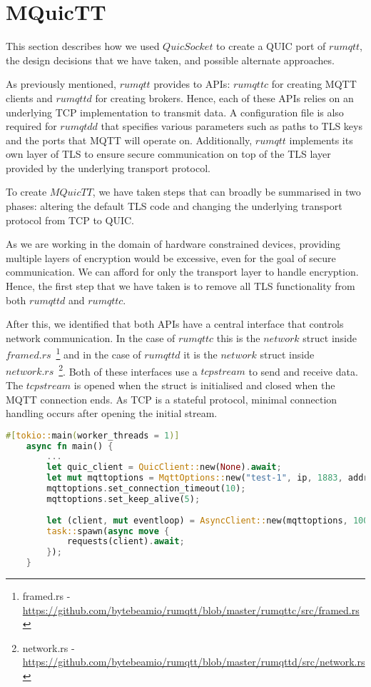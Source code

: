 \chapter{MQuicTT} \label{chap:port}

This section describes how we used $QuicSocket$ to create a QUIC port of $rumqtt$, the design decisions that we have taken, and possible alternate approaches.

As previously mentioned, $rumqtt$ provides to APIs: $rumqttc$ for creating MQTT clients and $rumqttd$ for creating brokers.
Hence, each of these APIs relies on an underlying TCP implementation to transmit data.
A configuration file is also required for $rumqtdd$ that specifies various parameters such as paths to TLS keys and the ports that MQTT will operate on.
Additionally, $rumqtt$ implements its own layer of TLS to ensure secure communication on top of the TLS layer provided by the underlying transport protocol.

To create $MQuicTT$, we have taken steps that can broadly be summarised in two phases: altering the default TLS code and changing the underlying transport protocol from TCP to QUIC.

As we are working in the domain of hardware constrained devices, providing multiple layers of encryption would be excessive, even for the goal of secure communication.
We can afford for only the transport layer to handle encryption.
Hence, the first step that we have taken is to remove all TLS functionality from both $rumqttd$ and $rumqttc$.

After this, we identified that both APIs have a central interface that controls network communication.
In the case of $rumqttc$ this is the $network$ struct inside $framed.rs$~\footnote{framed.rs - \url{https://github.com/bytebeamio/rumqtt/blob/master/rumqttc/src/framed.rs}} and in the case of $rumqttd$ it is the $network$ struct inside $network.rs$~\footnote{network.rs - \url{https://github.com/bytebeamio/rumqtt/blob/master/rumqttd/src/network.rs}}.
Both of these interfaces use a $tcpstream$ to send and receive data.
The $tcpstream$ is opened when the struct is initialised and closed when the MQTT connection ends.
As TCP is a stateful protocol, minimal connection handling occurs after opening the initial stream.

\begin{lstlisting}[language=Rust, caption={An example of initialising an MQuicTT client. The QUIC connection is established by initialising a $QuicClient$ and the resulting client is passed as an MQTT option.}, label=lst:MQuicTT:client]
    #[tokio::main(worker_threads = 1)]
    async fn main() {
        ...
        let quic_client = QuicClient::new(None).await;
        let mut mqttoptions = MqttOptions::new("test-1", ip, 1883, addr, quic_client);
        mqttoptions.set_connection_timeout(10);
        mqttoptions.set_keep_alive(5);
    
        let (client, mut eventloop) = AsyncClient::new(mqttoptions, 100);
        task::spawn(async move {
            requests(client).await;
        });
    }
\end{lstlisting}

